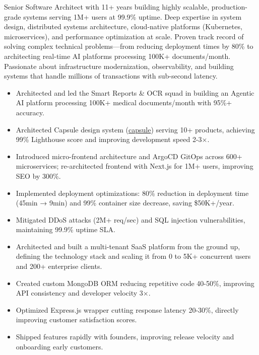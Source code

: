 \documentclass[10pt,a4paper,ragged2e,withhyper]{altacv}
\begin{document}


\makecvheader


Senior Software Architect with 11+ years building highly scalable, production-grade systems serving 1M+ users at 99.9\% uptime. Deep expertise in system design, distributed systems architecture, cloud-native platforms (Kubernetes, microservices), and performance optimization at scale. Proven track record of solving complex technical problems—from reducing deployment times by 80\% to architecting real-time AI platforms processing 100K+ documents/month. Passionate about infrastructure modernization, observability, and building systems that handle millions of transactions with sub-second latency.



\begin{itemize}
\item Architected and led the Smart Reports \& OCR squad in building an Agentic AI platform processing 100K+ medical documents/month with 95\%+ accuracy.
\item Architected Capsule design system (\href{https://design.bajajfinservhealth.in}{capsule}) serving 10+ products, achieving 99\% Lighthouse score and improving development speed 2-3×.
\item Introduced micro-frontend architecture and ArgoCD GitOps across 600+ microservices; re-architected frontend with Next.js for 1M+ users, improving SEO by 300\%.
\item Implemented deployment optimizations: 80\% reduction in deployment time (45min → 9min) and 99\% container size decrease, saving \$50K+/year.
\item Mitigated DDoS attacks (2M+ req/sec) and SQL injection vulnerabilities, maintaining 99.9\% uptime SLA.
\end{itemize}
\divider


\begin{itemize}
\item Architected and built a multi-tenant SaaS platform from the ground up, defining the technology stack and scaling it from 0 to 5K+ concurrent users and 200+ enterprise clients.
\item Created custom MongoDB ORM reducing repetitive code 40-50\%, improving API consistency and developer velocity 3×.
\item Optimized Express.js wrapper cutting response latency 20-30\%, directly improving customer satisfaction scores.
\item Shipped features rapidly with founders, improving release velocity and onboarding early customers.
\end{itemize}
\end{document}
